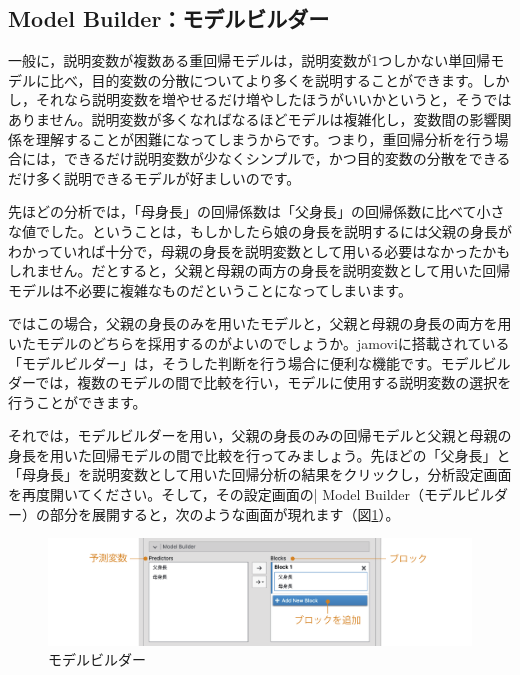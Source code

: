 \documentclass[
  12pt,
  a5jpaper,
  lualatex, ja=standard]{bxjsbook}
\begin{document}
\hypertarget{sub:regression-LR-modelbuilder}{%
\subsection{Model Builder：モデルビルダー}\label{sub:regression-LR-modelbuilder}}

一般に，説明変数が複数ある重回帰モデルは，説明変数が1つしかない単回帰モデルに比べ，目的変数の分散についてより多くを説明することができます。しかし，それなら説明変数を増やせるだけ増やしたほうがいいかというと，そうではありません。説明変数が多くなればなるほどモデルは複雑化し，変数間の影響関係を理解することが困難になってしまうからです。つまり，重回帰分析を行う場合には，できるだけ説明変数が少なくシンプルで，かつ目的変数の分散をできるだけ多く説明できるモデルが好ましいのです。

先ほどの分析では，「母身長」の回帰係数は「父身長」の回帰係数に比べて小さな値でした。ということは，もしかしたら娘の身長を説明するには父親の身長がわかっていれば十分で，母親の身長を説明変数として用いる必要はなかったかもしれません。だとすると，父親と母親の両方の身長を説明変数として用いた回帰モデルは不必要に複雑なものだということになってしまいます。

ではこの場合，父親の身長のみを用いたモデルと，父親と母親の身長の両方を用いたモデルのどちらを採用するのがよいのでしょうか。jamoviに搭載されている「モデルビルダー」は，そうした判断を行う場合に便利な機能です。モデルビルダーでは，複数のモデルの間で比較を行い，モデルに使用する説明変数の選択を行うことができます。

それでは，モデルビルダーを用い，父親の身長のみの回帰モデルと父親と母親の身長を用いた回帰モデルの間で比較を行ってみましょう。先ほどの「父身長」と「母身長」を説明変数として用いた回帰分析の結果をクリックし，分析設定画面を再度開いてください。そして，その設定画面の\colorbox{bar}{\textcolor{gmoji2}{| Model Builder}}（モデルビルダー）の部分を展開すると，次のような画面が現れます（図\ref{fig:regression-lr-model-builder}）。

\begin{figure}[!ht]

{\centering \includegraphics[width=1\linewidth]{images/regression/lr-model-builder} 

}

\caption{モデルビルダー}\label{fig:regression-lr-model-builder}
\end{figure}
\end{document}
